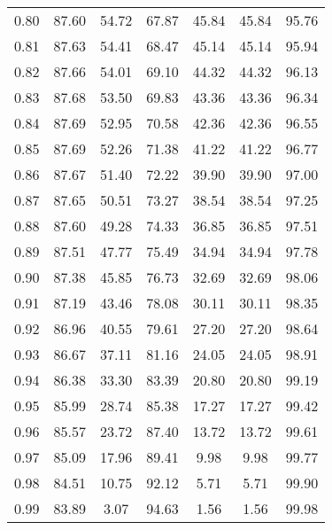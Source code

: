 \begin{tabular}{|c|c|c|c|c|c|c|}
      0.80 &     87.60 &     54.72 &      67.87 &   45.84 &      45.84 &         95.76 \\
      0.81 &     87.63 &     54.41 &      68.47 &   45.14 &      45.14 &         95.94 \\
      0.82 &     87.66 &     54.01 &      69.10 &   44.32 &      44.32 &         96.13 \\
      0.83 &     87.68 &     53.50 &      69.83 &   43.36 &      43.36 &         96.34 \\
      0.84 &     87.69 &     52.95 &      70.58 &   42.36 &      42.36 &         96.55 \\
      0.85 &     87.69 &     52.26 &      71.38 &   41.22 &      41.22 &         96.77 \\
      0.86 &     87.67 &     51.40 &      72.22 &   39.90 &      39.90 &         97.00 \\
      0.87 &     87.65 &     50.51 &      73.27 &   38.54 &      38.54 &         97.25 \\
      0.88 &     87.60 &     49.28 &      74.33 &   36.85 &      36.85 &         97.51 \\
      0.89 &     87.51 &     47.77 &      75.49 &   34.94 &      34.94 &         97.78 \\
      0.90 &     87.38 &     45.85 &      76.73 &   32.69 &      32.69 &         98.06 \\
      0.91 &     87.19 &     43.46 &      78.08 &   30.11 &      30.11 &         98.35 \\
      0.92 &     86.96 &     40.55 &      79.61 &   27.20 &      27.20 &         98.64 \\
      0.93 &     86.67 &     37.11 &      81.16 &   24.05 &      24.05 &         98.91 \\
      0.94 &     86.38 &     33.30 &      83.39 &   20.80 &      20.80 &         99.19 \\
      0.95 &     85.99 &     28.74 &      85.38 &   17.27 &      17.27 &         99.42 \\
      0.96 &     85.57 &     23.72 &      87.40 &   13.72 &      13.72 &         99.61 \\
      0.97 &     85.09 &     17.96 &      89.41 &    9.98 &       9.98 &         99.77 \\
      0.98 &     84.51 &     10.75 &      92.12 &    5.71 &       5.71 &         99.90 \\
      0.99 &     83.89 &      3.07 &      94.63 &    1.56 &       1.56 &         99.98 \\
\bottomrule
\end{tabular}
